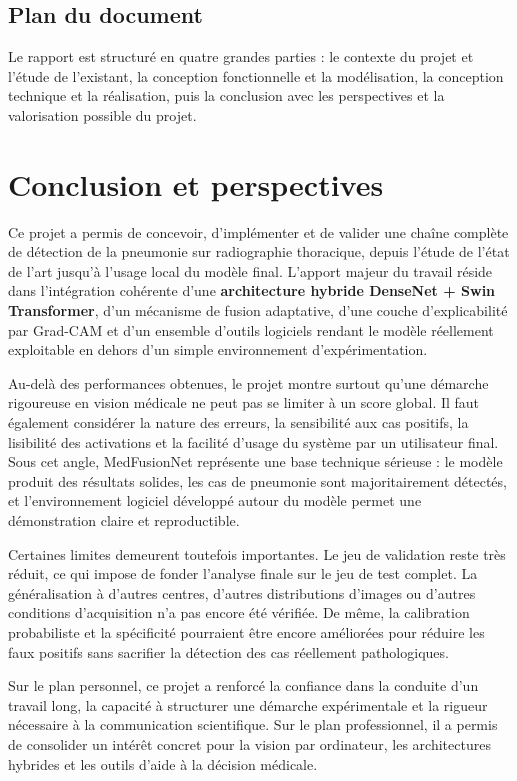 \documentclass[a4paper,11pt,oneside]{report}
\begin{document}
\section{Plan du document}
Le rapport est structuré en quatre grandes parties : le contexte du projet et l’étude de l’existant, la conception fonctionnelle et la modélisation, la conception technique et la réalisation, puis la conclusion avec les perspectives et la valorisation possible du projet.



\chapter{Conclusion et perspectives}
Ce projet a permis de concevoir, d'implémenter et de valider une chaîne complète de détection de la pneumonie sur radiographie thoracique, depuis l'étude de l'état de l'art jusqu'à l'usage local du modèle final. L'apport majeur du travail réside dans l'intégration cohérente d'une \textbf{architecture hybride DenseNet + Swin Transformer}, d'un mécanisme de fusion adaptative, d'une couche d'explicabilité par Grad-CAM et d'un ensemble d'outils logiciels rendant le modèle réellement exploitable en dehors d'un simple environnement d'expérimentation.

Au-delà des performances obtenues, le projet montre surtout qu'une démarche rigoureuse en vision médicale ne peut pas se limiter à un score global. Il faut également considérer la nature des erreurs, la sensibilité aux cas positifs, la lisibilité des activations et la facilité d'usage du système par un utilisateur final. Sous cet angle, MedFusionNet représente une base technique sérieuse : le modèle produit des résultats solides, les cas de pneumonie sont majoritairement détectés, et l'environnement logiciel développé autour du modèle permet une démonstration claire et reproductible.

Certaines limites demeurent toutefois importantes. Le jeu de validation reste très réduit, ce qui impose de fonder l'analyse finale sur le jeu de test complet. La généralisation à d'autres centres, d'autres distributions d'images ou d'autres conditions d'acquisition n'a pas encore été vérifiée. De même, la calibration probabiliste et la spécificité pourraient être encore améliorées pour réduire les faux positifs sans sacrifier la détection des cas réellement pathologiques.

Sur le plan personnel, ce projet a renforcé la confiance dans la conduite d’un travail long, la capacité à structurer une démarche expérimentale et la rigueur nécessaire à la communication scientifique. Sur le plan professionnel, il a permis de consolider un intérêt concret pour la vision par ordinateur, les architectures hybrides et les outils d’aide à la décision médicale.
\end{document}
